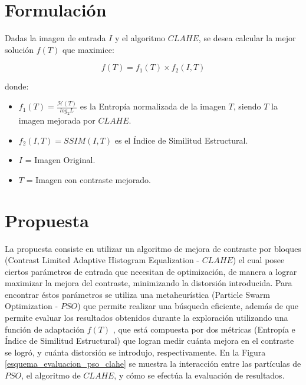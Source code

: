 \documentclass[a0,landscape,spanish]{a0poster}
\begin{document}
\begin{multicols}{3}
\section*{Formulación}

Dadas la imagen de entrada $I$ y el algoritmo $CLAHE$, se desea calcular la mejor solución $f(T)$ que maximice:

\begin{equation*}\label{eq:fitness}
    f(T) = f_1(T) \times f_2(I,T)
\end{equation*}

donde:
\begin{itemize}
\item $f_{1}(T)=\frac{\mathscr{H}(T)}{log_{2}L}$ es la Entropía normalizada de la imagen $T$, siendo $T$ la imagen mejorada por $CLAHE$.
\item $f_{2}(I,T)=SSIM(I,T)$ es el Índice de Similitud Estructural.

\item $I$ = Imagen Original.
\item $T$ = Imagen con contraste mejorado.
\end{itemize}

\color{DarkSlateGray} %


\section*{Propuesta}

La propuesta consiste en utilizar un algoritmo de mejora de contraste por bloques (Contrast Limited Adaptive Histogram Equalization - $CLAHE$) el cual posee ciertos parámetros de entrada que necesitan de optimización, de manera a lograr maximizar la mejora del contraste, minimizando la distorsión introducida. Para encontrar éstos parámetros se utiliza una metaheurística (Particle Swarm Optimization - $PSO$) que permite realizar una búsqueda eficiente, además de que permite evaluar los resultados obtenidos durante la exploración utilizando una función de adaptación $f(T)$ , que está compuesta por dos métricas (Entropía e Índice de Similitud Estructural) que logran medir cuánta mejora en el contraste se logró, y cuánta distorsión se introdujo, respectivamente. En la Figura \ref{esquema_evaluacion_pso_clahe} se muestra la interacción entre las partículas de $PSO$, el algoritmo de $CLAHE$, y cómo se efectúa la evaluación de resultados.



\end{multicols}
\end{document}
